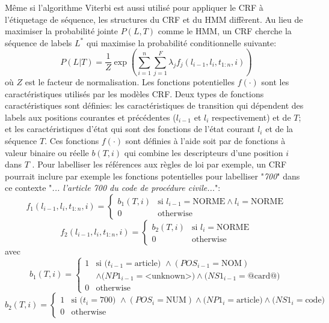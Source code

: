 Même si l'algorithme Viterbi est aussi utilisé pour appliquer le CRF à l'étiquetage de séquence, les structures du CRF et du HMM diffèrent. Au lieu de maximiser la probabilité jointe $ P(L, T)$ comme le HMM, un CRF \citep{lafferty2001crfie} cherche la séquence de labels $L^*$ qui maximise la probabilité conditionnelle suivante: $$P(L|T) = \frac{1}{Z}\exp \left(\sum\limits_{i=1}^n\sum\limits_{j=1}^F \lambda_j f_j(l_{i-1},l_i,t_{1:n},i)\right)$$ où $Z$ est le facteur de normalisation. Les fonctions potentielles $f(\cdot)$ sont les caractéristiques utilisés par les modèles CRF. Deux types de fonctions caractéristiques sont définies: les caractéristiques de transition qui dépendent des labels aux positions courantes et précédentes ($l_{i-1}$ et $ l_{i}$ respectivement) et de $T$; et les caractéristiques d'état qui sont des fonctions de l'état courant $ l_{i} $ et de la séquence $ T $. Ces fonctions $f(\cdot)$ sont définies à l'aide soit par de fonctions à valeur binaire ou réelle $b(T,i)$ qui combine les descripteurs d'une position $i$ dans $T$ \citep{Wallach2004crfintro}. Pour labelliser les références aux règles de loi par exemple, un CRF pourrait inclure par exemple les fonctions potentielles pour labelliser "\textit{700}" dans ce contexte "\textit{... l'article 700 du code de procédure civile...}":
{\scriptsize
\[f_1(l_{i-1},l_i,t_{1:n},i) = \left\lbrace \begin{array}{ll}
b_1(T,i) & \text{si } l_{i-1} = \text{NORME} \wedge l_i = \text{NORME} \\
0 & \text{otherwise}
\end{array} \right.\]
\[f_2(l_{i-1},l_i,t_{1:n},i) = \left\lbrace \begin{array}{ll}
b_2(T,i) & \text{si }l_i = \text{NORME} \\
0 & \text{otherwise}
\end{array} \right.\]
avec
\[b_1(T,i) = \left\lbrace \begin{array}{ll}
1 & \text{si } (t_{i-1} =\text{article) }\wedge (POS_{i-1}=\text{NOM}) \\&  \wedge  (NP1_{i-1}=\text{<unknown>)} \wedge (NS1_{i-1}=\text{@card@)} \\
0 & \text{otherwise} 
\end{array} \right.\]
\[b_2(T,i) = \left\lbrace \begin{array}{ll}
1 & \text{si } (t_i =\text{700) }\wedge (POS_i=\text{NUM})  \wedge (NP1_i=\text{article)} 
\wedge (NS1_i=\text{code)} \\
0 & \text{otherwise}
\end{array} \right.\]
}
